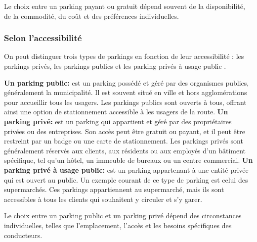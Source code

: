 Le choix entre un parking payant ou gratuit dépend souvent de la disponibilité, de la commodité, du coût et des préférences individuelles.

\subsubsection{Selon l'accessibilité}
On peut distinguer trois types de parkings en fonction de leur accessibilité : les parkings privés, les parkings publics et les parking privés à usage public \cite{lepermislibre}.

\begin{outline}
    \1  \textbf{Un parking public: } est un parking possédé et géré par des organismes publics, généralement la municipalité. Il est souvent situé en ville et hors agglomérations pour accueillir tous les usagers. Les parkings publics sont ouverts à tous, offrant ainsi une option de stationnement accessible à les usagers de la route.
    \1  \textbf{Un parking privé: } est un parking qui appartient et géré par des propriétaires privées ou des entreprises. Son accès peut être gratuit ou payant, et il peut être restreint par un badge ou une carte de stationnement. Les parkings privés sont généralement réservés aux clients, aux résidents ou aux employés d'un bâtiment spécifique, tel qu'un hôtel, un immeuble de bureaux ou un centre commercial. 
    \1  \textbf{Un parking privé à usage public: } est un parking appartenant à une entité privée qui est ouvert au public. 
    Un exemple courant de ce type de parking est celui des supermarchés. Ces parkings appartiennent au supermarché, mais ils sont accessibles à tous les clients qui souhaitent y circuler et s'y garer.

\end{outline}

Le choix entre un parking public et un parking privé dépend des circonstances individuelles, telles que l'emplacement, l'accès et les besoins spécifiques des conducteurs. 

    
